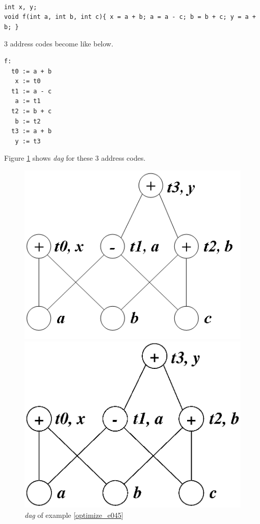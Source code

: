 \begin{Example}
\label{optimize_e045}
\begin{verbatim}

int x, y;
void f(int a, int b, int c){ x = a + b; a = a - c; b = b + c; y = a + b; }
\end{verbatim}
3 address codes become like below.
\begin{verbatim}
f:
  t0 := a + b
   x := t0
  t1 := a - c
   a := t1
  t2 := b + c
   b := t2
  t3 := a + b
   y := t3
\end{verbatim}
Figure \ref{optimize_e046} shows {\em dag} for these 3 address codes.
\begin{figure}[htbp]
\begin{center}
\begin{htmlonly}
\includegraphics[width=0.7\linewidth,height=0.540\linewidth]{opt024.png}
\end{htmlonly}
\begin{latexonly}
\includegraphics[width=0.7\linewidth,height=0.540\linewidth]{opt024.eps}
\end{latexonly}
\caption{{\em dag} of example \ref{optimize_e045}}
\label{optimize_e046}
\end{center}

\end{figure}
\end{Example}
